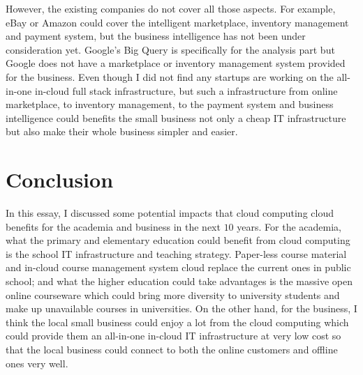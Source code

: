 However, the existing companies do not cover all those aspects. For example, eBay or Amazon could cover the intelligent marketplace, inventory management and payment system, but the business intelligence has not been under consideration yet. Google's Big Query is specifically for the analysis part but Google does not have a marketplace or inventory management system provided for the business. Even though I did not find any startups are working on the all-in-one in-cloud full stack infrastructure, but such a infrastructure from online marketplace, to inventory management, to the payment system and business intelligence could benefits the small business not only a cheap IT infrastructure but also make their whole business simpler and easier. 

\section{Conclusion}
In this essay, I discussed some potential impacts that cloud computing cloud benefits for the academia and business in the next $10$ years. For the academia, what the primary and elementary education could benefit from cloud computing is the school IT infrastructure and teaching strategy. Paper-less course material and in-cloud course management system cloud replace the current ones in public school; and what the higher education could take advantages is the massive open online courseware which could bring more diversity to university students and make up unavailable courses in universities. On the other hand, for the business, I think the local small business could enjoy a lot from the cloud computing which could provide them an all-in-one in-cloud IT infrastructure at very low cost so that the local business could connect to both the online customers and offline ones very well.
